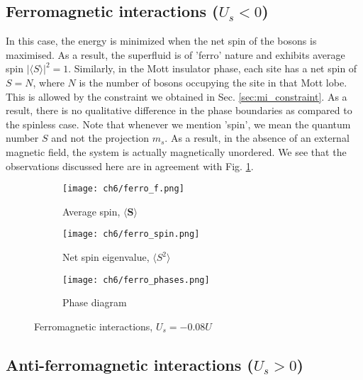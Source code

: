 \subsection{Ferromagnetic interactions ($U_s < 0$)}
In this case, the energy is minimized when the net spin of the bosons is maximised. As a result, the superfluid is of 'ferro' nature and exhibits average spin $|\langle S \rangle|^2 = 1$. Similarly, in the Mott insulator phase, each site has a net spin of $S = N$, where $N$ is the number of bosons occupying the site in that Mott lobe. This is allowed by the constraint we obtained in Sec. \ref{sec:mi_constraint}. As a result, there is no qualitative difference in the phase boundaries as compared to the spinless case. Note that whenever we mention 'spin', we mean the quantum number $S$ and not the projection $m_s$. As a result, in the absence of an external magnetic field, the system is actually magnetically unordered. We see that the observations discussed here are in agreement with Fig. \ref{fig:ferro}.
\begin{figure}[!htb]
    \centering
    \begin{subfigure}[b]{0.49\textwidth}  %
        \centering
        \texttt{[image: ch6/ferro\_f.png]}
        \caption{Average spin, $\langle \mathbf{S} \rangle$}
    \end{subfigure}
    \hspace{1em}  %
    \begin{subfigure}[b]{0.45\textwidth}
        \centering
        \texttt{[image: ch6/ferro\_spin.png]}
        \caption{Net spin eigenvalue, $\langle S^2 \rangle$}
    \end{subfigure}
    \hspace{1em}
    \vspace{0.5cm}  %
    \centering
    \begin{subfigure}[b]{0.75\textwidth}  %
        \centering
        \texttt{[image: ch6/ferro\_phases.png]}
        \caption{Phase diagram}
    \end{subfigure}
    \caption{Ferromagnetic interactions, $U_s = -0.08U$}
    \label{fig:ferro}
\end{figure}
\FloatBarrier \!\!\!\!\!\!\!\!\!\!\!

\subsection{Anti-ferromagnetic interactions ($U_s > 0$)}


